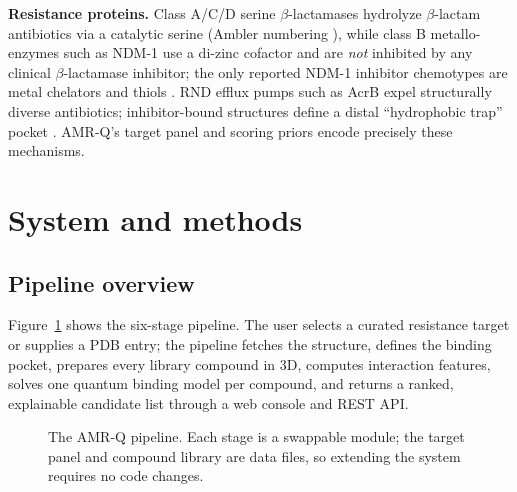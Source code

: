 \documentclass[10pt,twocolumn]{article}
\begin{document}
\textbf{Resistance proteins.} Class A/C/D serine $\beta$-lactamases hydrolyze
$\beta$-lactam antibiotics via a catalytic serine (Ambler numbering \cite{ambler1991}),
while class B metallo-enzymes such as NDM-1 use a di-zinc cofactor and are \emph{not}
inhibited by any clinical $\beta$-lactamase inhibitor; the only reported NDM-1
inhibitor chemotypes are metal chelators and thiols \cite{bush2019,king2014}. RND
efflux pumps such as AcrB expel structurally diverse antibiotics; inhibitor-bound
structures define a distal ``hydrophobic trap'' pocket \cite{nakashima2011,opperman2014}.
AMR-Q's target panel and scoring priors encode precisely these mechanisms.

\section{System and methods}

\subsection{Pipeline overview}

Figure~\ref{fig:pipeline} shows the six-stage pipeline. The user selects a curated
resistance target or supplies a PDB entry; the pipeline fetches the structure, defines
the binding pocket, prepares every library compound in 3D, computes interaction
features, solves one quantum binding model per compound, and returns a ranked,
explainable candidate list through a web console and REST API.

\begin{figure}[t]
\centering
{}
\caption{The AMR-Q pipeline. Each stage is a swappable module; the target panel and
compound library are data files, so extending the system requires no code changes.}
\label{fig:pipeline}
\end{figure}
\end{document}
